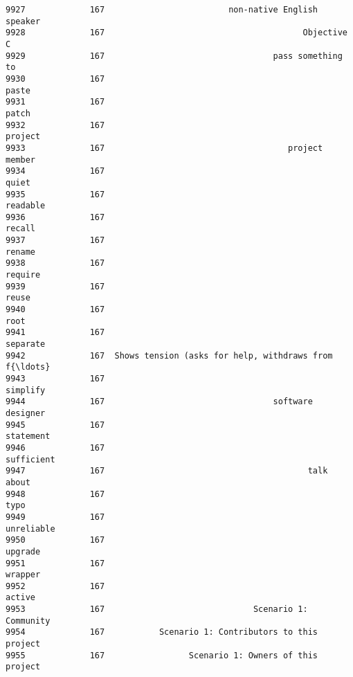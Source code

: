 \documentclass[11pt]{article}
\begin{document}
\begin{Verbatim}[commandchars=\\\{\}]
9927             167                         non-native English speaker   
9928             167                                        Objective C   
9929             167                                  pass something to   
9930             167                                              paste   
9931             167                                              patch   
9932             167                                            project   
9933             167                                     project member   
9934             167                                              quiet   
9935             167                                           readable   
9936             167                                             recall   
9937             167                                             rename   
9938             167                                            require   
9939             167                                              reuse   
9940             167                                               root   
9941             167                                           separate   
9942             167  Shows tension (asks for help, withdraws from f{\ldots}   
9943             167                                           simplify   
9944             167                                  software designer   
9945             167                                          statement   
9946             167                                         sufficient   
9947             167                                         talk about   
9948             167                                               typo   
9949             167                                         unreliable   
9950             167                                            upgrade   
9951             167                                            wrapper   
9952             167                                             active   
9953             167                              Scenario 1: Community   
9954             167           Scenario 1: Contributors to this project   
9955             167                 Scenario 1: Owners of this project   


\end{Verbatim}
\end{document}
